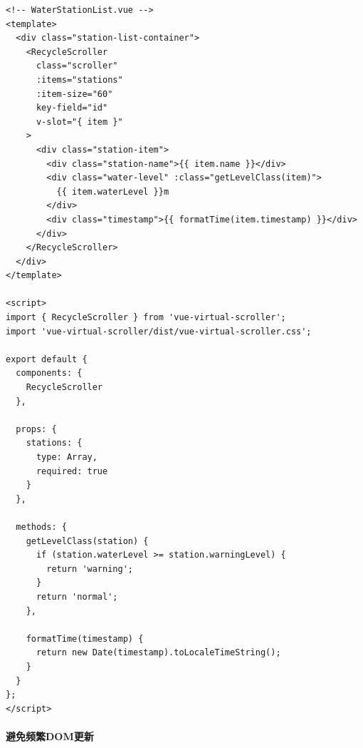 \begin{lstlisting}
<!-- WaterStationList.vue -->
<template>
  <div class="station-list-container">
    <RecycleScroller
      class="scroller"
      :items="stations"
      :item-size="60"
      key-field="id"
      v-slot="{ item }"
    >
      <div class="station-item">
        <div class="station-name">{{ item.name }}</div>
        <div class="water-level" :class="getLevelClass(item)">
          {{ item.waterLevel }}m
        </div>
        <div class="timestamp">{{ formatTime(item.timestamp) }}</div>
      </div>
    </RecycleScroller>
  </div>
</template>

<script>
import { RecycleScroller } from 'vue-virtual-scroller';
import 'vue-virtual-scroller/dist/vue-virtual-scroller.css';

export default {
  components: {
    RecycleScroller
  },
  
  props: {
    stations: {
      type: Array,
      required: true
    }
  },
  
  methods: {
    getLevelClass(station) {
      if (station.waterLevel >= station.warningLevel) {
        return 'warning';
      }
      return 'normal';
    },
    
    formatTime(timestamp) {
      return new Date(timestamp).toLocaleTimeString();
    }
  }
};
</script>
\end{lstlisting}

\paragraph{避免频繁DOM更新}\label{ux907fux514dux9891ux7e41domux66f4ux65b0}

